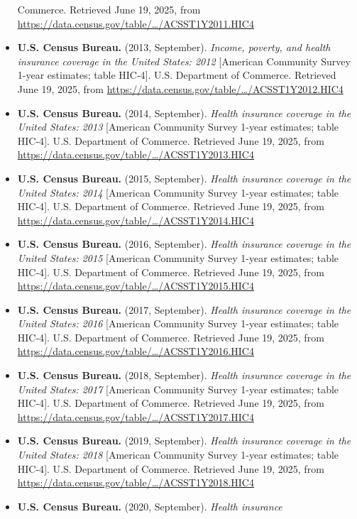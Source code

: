 \documentclass[
]{article}
\begin{document}
\begin{itemize}
  Commerce. Retrieved June 19, 2025, from
  \url{https://data.census.gov/table/…/ACSST1Y2011.HIC4}
\item
  \textbf{U.S. Census Bureau.} (2013, September). \emph{Income, poverty,
  and health insurance coverage in the United States: 2012} {[}American
  Community Survey 1-year estimates; table HIC‑4{]}. U.S. Department of
  Commerce. Retrieved June 19, 2025, from
  \url{https://data.census.gov/table/…/ACSST1Y2012.HIC4}
\item
  \textbf{U.S. Census Bureau.} (2014, September). \emph{Health insurance
  coverage in the United States: 2013} {[}American Community Survey
  1-year estimates; table HIC‑4{]}. U.S. Department of Commerce.
  Retrieved June 19, 2025, from
  \url{https://data.census.gov/table/…/ACSST1Y2013.HIC4}
\item
  \textbf{U.S. Census Bureau.} (2015, September). \emph{Health insurance
  coverage in the United States: 2014} {[}American Community Survey
  1-year estimates; table HIC‑4{]}. U.S. Department of Commerce.
  Retrieved June 19, 2025, from
  \url{https://data.census.gov/table/…/ACSST1Y2014.HIC4}
\item
  \textbf{U.S. Census Bureau.} (2016, September). \emph{Health insurance
  coverage in the United States: 2015} {[}American Community Survey
  1-year estimates; table HIC‑4{]}. U.S. Department of Commerce.
  Retrieved June 19, 2025, from
  \url{https://data.census.gov/table/…/ACSST1Y2015.HIC4}
\item
  \textbf{U.S. Census Bureau.} (2017, September). \emph{Health insurance
  coverage in the United States: 2016} {[}American Community Survey
  1-year estimates; table HIC‑4{]}. U.S. Department of Commerce.
  Retrieved June 19, 2025, from
  \url{https://data.census.gov/table/…/ACSST1Y2016.HIC4}
\item
  \textbf{U.S. Census Bureau.} (2018, September). \emph{Health insurance
  coverage in the United States: 2017} {[}American Community Survey
  1-year estimates; table HIC‑4{]}. U.S. Department of Commerce.
  Retrieved June 19, 2025, from
  \url{https://data.census.gov/table/…/ACSST1Y2017.HIC4}
\item
  \textbf{U.S. Census Bureau.} (2019, September). \emph{Health insurance
  coverage in the United States: 2018} {[}American Community Survey
  1-year estimates; table HIC‑4{]}. U.S. Department of Commerce.
  Retrieved June 19, 2025, from
  \url{https://data.census.gov/table/…/ACSST1Y2018.HIC4}
\item
  \textbf{U.S. Census Bureau.} (2020, September). \emph{Health insurance
}
\end{itemize}
\end{document}

